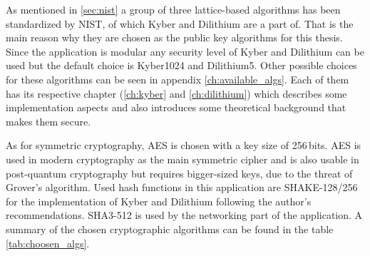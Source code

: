 As mentioned in \ref{sec:nist} a group of three lattice-based algorithms has been standardized by NIST, of which Kyber and Dilithium are a part of. That is the main reason why they are chosen as the public key algorithms for this thesis. Since the application is modular any security level of Kyber and Dilithium can be used but the default choice is Kyber1024 and Dilithium5. Other possible choices for these algorithms can be seen in appendix \ref{ch:available_algs}. Each of them has its respective chapter (\ref{ch:kyber} and \ref{ch:dilithium}) which describes some implementation aspects and also introduces some theoretical background that makes them secure.


As for symmetric cryptography, AES is chosen with a key size of 256\,bits. AES is used in modern cryptography as the main symmetric cipher and is also usable in post-quantum cryptography but requires bigger-sized keys, due to the threat of Grover's algorithm. Used hash functions in this application are SHAKE-128/256 for the implementation of Kyber and Dilithium following the author's recommendations. SHA3-512 is used by the networking part of the application. A summary of the chosen cryptographic algorithms can be found in the table \ref{tab:choosen_algs}.
